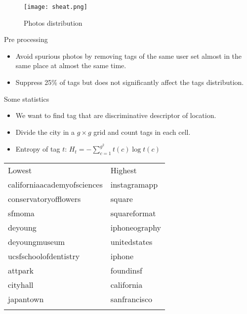 \begin{frame}

\begin{figure} \texttt{[image: sheat.png]}
\caption{Photos distribution}
\end{figure}

\end{frame}

\begin{frame}{Pre processing}

\begin{itemize}
\item
  Avoid spurious photos by removing tags of the same user set almost in
  the same place at almost the same time.
\item
  Suppress 25\% of tags but does not significantly affect the tags
  distribution.
\end{itemize}

\end{frame}

\begin{frame}{Some statistics}

\begin{itemize}
\item
  We want to find tag that are discriminative descriptor of location.
\item
  Divide the city in a $g\times g$ grid and count tags in each cell.
\item
  Entropy of tag $t$: $H_t = -\sum_{c=1}^{g^2} t(c)\log t(c)$
\end{itemize}

\begin{small}
\begin{longtable}[c]{@{}ll@{}}
\hline\noalign{\medskip}
Lowest & Highest
\\\noalign{\medskip}
\hline\noalign{\medskip}
californiaacademyofsciences & instagramapp
\\\noalign{\medskip}
conservatoryofflowers & square
\\\noalign{\medskip}
sfmoma & squareformat
\\\noalign{\medskip}
deyoung & iphoneography
\\\noalign{\medskip}
deyoungmuseum & unitedstates
\\\noalign{\medskip}
ucsfschoolofdentistry & iphone
\\\noalign{\medskip}
attpark & foundinsf
\\\noalign{\medskip}
cityhall & california
\\\noalign{\medskip}
japantown & sanfrancisco
\\\noalign{\medskip}
\hline
\end{longtable}
\end{small}

\end{frame}

